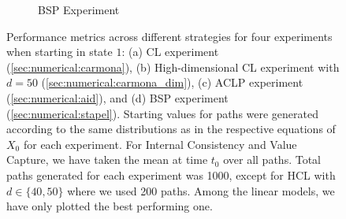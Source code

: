 \documentclass[11pt,reqno,a4paper]{amsart}
\theoremstyle{definition}
\numberwithin{equation}{section}
\DeclareMathOperator{\1}{\mathbbm{1}}
\begin{document}
\begin{figure}[!htbp]
\begin{subfigure}[t]{0.48\textwidth}
    \caption{BSP Experiment}
    \label{fig:stapel_results}
  \end{subfigure}

  \vspace{1em}
  \centering

  \caption{Performance metrics across different strategies for four experiments when starting in state $1$: (a) CL experiment (\cref{sec:numerical:carmona}), (b) High-dimensional CL experiment with $d=50$ (\cref{sec:numerical:carmona_dim}), (c) ACLP experiment (\cref{sec:numerical:aid}), and (d) BSP experiment (\cref{sec:numerical:stapel}). Starting values for paths were generated according to the same distributions as in the respective equations of $X_0$ for each experiment. For Internal Consistency and Value Capture, we have taken the mean at time $t_0$ over all paths. Total paths generated for each experiment was 1000, except for HCL with $d\in \{40,50\}$ where we used 200 paths. Among the linear models, we have only plotted the best performing one.}
  \label{fig:combined_results}
\end{figure}
\end{document}
